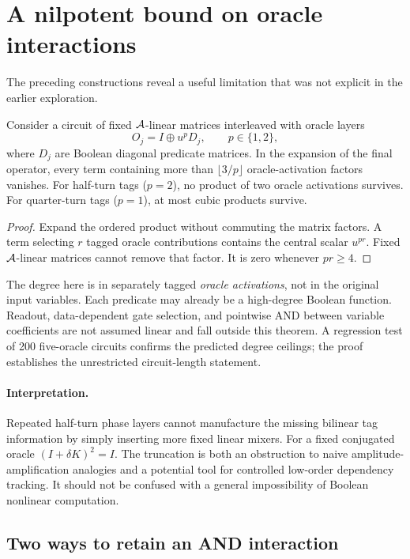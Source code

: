 \section{A nilpotent bound on oracle interactions}\label{sec:nilbound}
The preceding constructions reveal a useful limitation that was not explicit in the earlier exploration.

\begin{theorem}\label{thm:interaction}
Consider a circuit of fixed $\mathcal A$-linear matrices interleaved with oracle layers
\begin{equation}
 O_j=I\oplus u^pD_j,\qquad p\in\{1,2\},
\end{equation}
where $D_j$ are Boolean diagonal predicate matrices. In the expansion of the final operator, every term containing more than $\lfloor3/p\rfloor$ oracle-activation factors vanishes. For half-turn tags ($p=2$), no product of two oracle activations survives. For quarter-turn tags ($p=1$), at most cubic products survive.
\end{theorem}
\begin{proof}
Expand the ordered product without commuting the matrix factors. A term selecting $r$ tagged oracle contributions contains the central scalar $u^{pr}$. Fixed $\mathcal A$-linear matrices cannot remove that factor. It is zero whenever $pr\ge4$.
\end{proof}
The degree here is in separately tagged \emph{oracle activations}, not in the original input variables. Each predicate may already be a high-degree Boolean function. Readout, data-dependent gate selection, and pointwise AND between variable coefficients are not assumed linear and fall outside this theorem. A regression test of 200 five-oracle circuits confirms the predicted degree ceilings; the proof establishes the unrestricted circuit-length statement.

\paragraph{Interpretation.}
Repeated half-turn phase layers cannot manufacture the missing bilinear tag information by simply inserting more fixed linear mixers. For a fixed conjugated oracle $(I+\delta K)^2=I$. The truncation is both an obstruction to naive amplitude-amplification analogies and a potential tool for controlled low-order dependency tracking. It should not be confused with a general impossibility of Boolean nonlinear computation.

\subsection{Two ways to retain an AND interaction}
